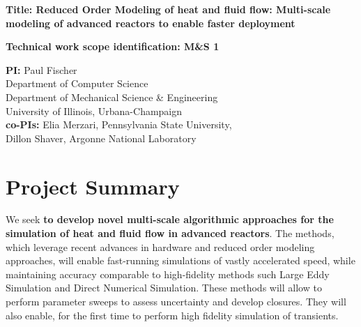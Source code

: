 
\parindent 0in
\parskip 0.1in

{\bf Title:  Reduced Order Modeling of heat and fluid flow: Multi-scale modeling of advanced reactors to enable faster deployment }

{\bf Technical work scope identification: M\&S 1 }

{\bf PI:}
Paul Fischer \\
Department of Computer Science \\
Department of Mechanical Science \& Engineering \\
University of Illinois, Urbana-Champaign \\

{\bf co-PIs:}
Elia Merzari, Pennsylvania State University, \\
Dillon Shaver, Argonne National Laboratory \\

\section{Project Summary}


We seek \textbf{to develop novel multi-scale algorithmic approaches for the
simulation of heat and fluid flow in advanced reactors}. The methods, which
leverage recent advances in hardware and reduced order modeling approaches,
will enable fast-running simulations of vastly accelerated speed, while
maintaining accuracy comparable to high-fidelity methods such Large Eddy
Simulation and Direct Numerical Simulation. These methods will allow to perform
parameter sweeps to assess uncertainty and develop closures. They will also
enable, for the first time to perform high fidelity simulation of transients.

